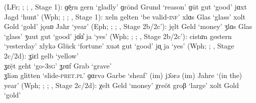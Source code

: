 \ea%
\label{ex:14:4}
   (LFr; \citealt{Hanenberg1915}; ; , Stage 1):
\ea\label{ex:14:4a}  ɡēͅrn \tab [ɣɛːrn] \tab gern \tab ‘gladly’ 
\ex\label{ex:14:4b}  ɡrōnd \tab [ɣʀoːnt] \tab Grund \tab ‘reason’ 
\ex\label{ex:14:4c}  ɡūt \tab [ɣuːt] \tab gut \tab ‘good’ 
\ex\label{ex:14:4d}  jɑxt \tab [ʝɑxt] \tab Jagd \tab ‘hunt’ 
\z 
\ex%
\label{ex:14:5} (Wph; \citealt{Wix1921}; ; , Stage 1):
\ea\label{ex:14:5a} xeln \tab [xeln̩] \tab gelten \tab ‘be valid\textsc{{}-inf}’ 
\ex\label{ex:14:5b} xlɑs \tab [xlɑs] \tab Glas \tab ‘glass’ 
\ex\label{ex:14:5c} xolt \tab [xɔlt] \tab Gold \tab ‘gold’ 
\ex\label{ex:14:5d} jǫuɒ \tab [ʝɔuɐ] \tab Jahr \tab ‘year’ 
\z 
\ex%
\label{ex:14:6} (Eph; \citealt{Block1910}; ; , Stage 2b/2c{}'):
\ea\label{ex:14:6a} jęlt \tab [ʝɛlt] \tab Geld \tab ‘money’ 
\ex\label{ex:14:6b} ʒlɑs \tab [ɣlɑs] \tab Glas \tab ‘glass’ 
\ex\label{ex:14:6c} ʒuut \tab [ɣuːt] \tab gut \tab  ‘good’ 
\ex\label{ex:14:6d} jɑ̊ɑ̊ \tab  [ʝɑː] \tab  ja  \tab  ‘yes’ 
\z
\ex%
\label{ex:14:7}  (Wph; \citealt{Holthausen1886}; ; , Stage 2b/2c{}'):
\ea\label{ex:14:7a} cist\textit{ɑ}n \tab  [çɪstɐn] \tab gestern \tab ‘yesterday’ 
\ex\label{ex:14:7b} xlykə \tab [xlʏkə] \tab Glück \tab  ‘fortune’ 
\ex\label{ex:14:7c} xuət \tab [xuət]  \tab  gut \tab ‘good’ 
\ex\label{ex:14:7d} jɑͅͅͅ \tab [ʝɔː] \tab ja \tab ‘yes’  
\z 
\ex%
\label{ex:14:8} (Wph; \citealt{Beisenherz1907}; , Stage 2c/2d):
\ea\label{ex:14:8a} ʓĭɛl \tab [ʝɪɛl] \tab gelb \tab ‘yellow’ \\
    ʓɛẹ̆t \tab [ʝɛet] \tab geht \tab ‘go\textsc{{}-3sg}’ 
\ex\label{ex:14:8b} ʓrɑf \tab [ʝrɑf] \tab  Grab \tab ‘grave’ \\
    ʓlīən \tab [ʝliːən] \tab  glitten \tab ‘slide\textsc{{}-pret.pl}’ 
\ex\label{ex:14:8c} ɡɑrvə \tab [ɣɑrvə] \tab Garbe \tab ‘sheaf’ 
\ex\label{ex:14:8d} (im) jɔ̄ərə \tab [ʝɔːərə] \tab (im) Jahre \tab ‘(in the) year’ 
\z 
\ex%
\label{ex:14:9} (Wph; \citealt{Arens1908}; ; ,  Stage 2c/2d):
\ea\label{ex:14:9a} χelt \tab [çɛlt] \tab Geld \tab ‘money’ 
\ex\label{ex:14:9b} χreŏt \tab [çrɛɔt] \tab groβ \tab ‘large’ 
\ex\label{ex:14:9c} xolt \tab [xɔlt] \tab Gold \tab ‘gold’ 
